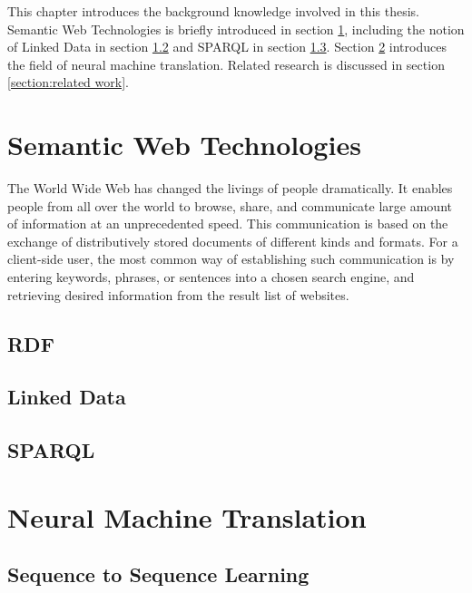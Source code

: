 
This chapter introduces the background knowledge involved in this thesis. Semantic Web Technologies is briefly introduced in section \ref{section:semantic web technologies}, including the notion of Linked Data in section \ref{subsection:linked data} and SPARQL in section \ref{subsection:sparql}. Section \ref{section:neural machine translation} introduces the field of neural machine translation. Related research is discussed in section \ref{section:related work}.

\section{Semantic Web Technologies} \label{section:semantic web technologies}

The World Wide Web has changed the livings of people dramatically. It enables people from all over the world to browse, share, and communicate large amount of information at an unprecedented speed. This communication is based on the exchange of distributively stored documents of different kinds and formats. For a client-side user, the most common way of establishing such communication is by entering keywords, phrases, or sentences into a chosen search engine, and retrieving desired information from the result list of websites. 

\subsection{RDF} 

\subsection{Linked Data} \label{subsection:linked data}

\subsection{SPARQL} \label{subsection:sparql}


\section{Neural Machine Translation} \label{section:neural machine translation}

\subsection{Sequence to Sequence Learning}


